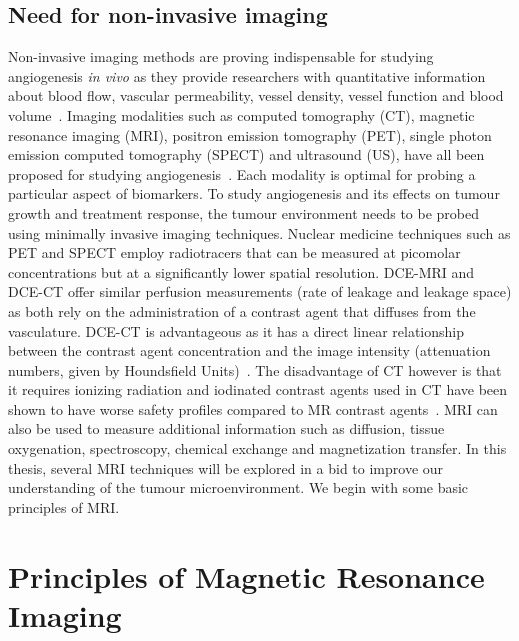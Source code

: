 \subsection{Need for non-invasive imaging}
Non-invasive imaging methods are proving indispensable for studying angiogenesis \emph{in vivo} as they provide researchers with quantitative information about blood flow, vascular permeability, vessel density, vessel function and blood volume~\cite{McDonald:2003cm}.
Imaging modalities such as computed tomography (CT), magnetic resonance imaging (MRI), positron emission tomography (PET), single photon emission computed tomography (SPECT) and ultrasound (US), have all been proposed for studying angiogenesis~\cite{Laking:2006ij}.
Each modality is optimal for probing a particular aspect of biomarkers. 
To study angiogenesis and its effects on tumour growth and treatment response, the tumour environment needs to be probed using minimally invasive imaging techniques. 
Nuclear medicine techniques such as PET and SPECT employ radiotracers that can be measured at picomolar concentrations but at a significantly lower spatial resolution.
DCE-MRI and DCE-CT offer similar perfusion measurements (rate of leakage and leakage space) as both rely on the administration of a contrast agent that diffuses from the vasculature.
DCE-CT is advantageous as it has a direct linear relationship between the contrast agent concentration and the image intensity (attenuation numbers, given by Houndsfield Units)~\cite{Cuenod:2006jy}.
The disadvantage of CT however is that it requires ionizing radiation and iodinated contrast agents used in CT have been shown to have worse safety profiles compared to MR contrast agents~\cite{Hasebroock:2009hw}.
MRI can also be used to measure additional information such as diffusion, tissue oxygenation, spectroscopy, chemical exchange and magnetization transfer. 
In this thesis, several MRI techniques will be explored in a bid to improve our understanding of the tumour microenvironment.
We begin with some basic principles of MRI.

\section{Principles of Magnetic Resonance Imaging}


